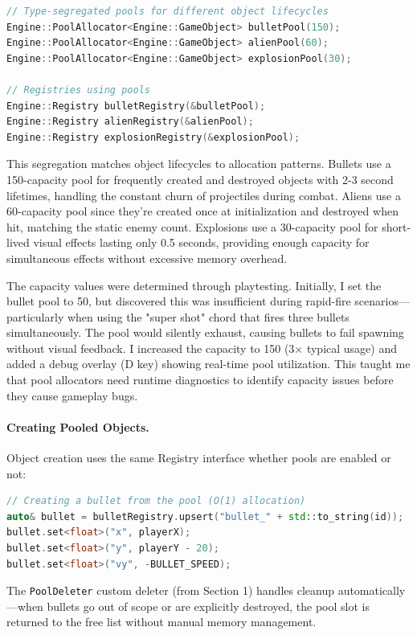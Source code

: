 \documentclass[12pt]{article}
\begin{document}
\begin{lstlisting}[language=C++]
// Type-segregated pools for different object lifecycles
Engine::PoolAllocator<Engine::GameObject> bulletPool(150);
Engine::PoolAllocator<Engine::GameObject> alienPool(60);
Engine::PoolAllocator<Engine::GameObject> explosionPool(30);

// Registries using pools
Engine::Registry bulletRegistry(&bulletPool);
Engine::Registry alienRegistry(&alienPool);
Engine::Registry explosionRegistry(&explosionPool);
\end{lstlisting}

This segregation matches object lifecycles to allocation patterns. Bullets use a 150-capacity pool for frequently created and destroyed objects with 2-3 second lifetimes, handling the constant churn of projectiles during combat. Aliens use a 60-capacity pool since they're created once at initialization and destroyed when hit, matching the static enemy count. Explosions use a 30-capacity pool for short-lived visual effects lasting only 0.5 seconds, providing enough capacity for simultaneous effects without excessive memory overhead.

The capacity values were determined through playtesting. Initially, I set the bullet pool to 50, but discovered this was insufficient during rapid-fire scenarios—particularly when using the "super shot" chord that fires three bullets simultaneously. The pool would silently exhaust, causing bullets to fail spawning without visual feedback. I increased the capacity to 150 (3× typical usage) and added a debug overlay (D key) showing real-time pool utilization. This taught me that pool allocators need runtime diagnostics to identify capacity issues before they cause gameplay bugs.

\paragraph{Creating Pooled Objects.}
Object creation uses the same Registry interface whether pools are enabled or not:

\begin{lstlisting}[language=C++]
// Creating a bullet from the pool (O(1) allocation)
auto& bullet = bulletRegistry.upsert("bullet_" + std::to_string(id));
bullet.set<float>("x", playerX);
bullet.set<float>("y", playerY - 20);
bullet.set<float>("vy", -BULLET_SPEED);
\end{lstlisting}

The \texttt{PoolDeleter} custom deleter (from Section 1) handles cleanup automatically—when bullets go out of scope or are explicitly destroyed, the pool slot is returned to the free list without manual memory management.
\end{document}
